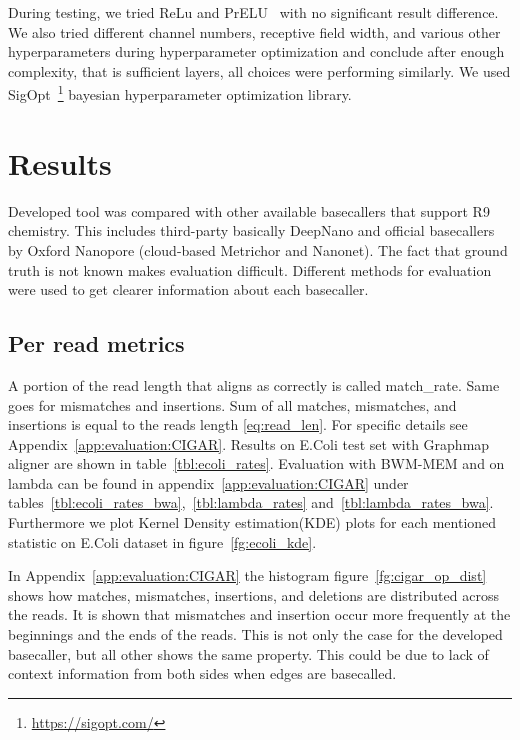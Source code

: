 \documentclass[runningheads,a4paper]{llncs}
\begin{document}
During testing, we tried ReLu and PrELU~\cite{prelu} with no significant result difference. We also tried different channel numbers, receptive field width, and various other hyperparameters during hyperparameter optimization and conclude after enough complexity, that is sufficient layers, all choices were performing similarly. We used SigOpt~\cite{dewancker2016strategy}\footnote{\url{https://sigopt.com/}} bayesian hyperparameter optimization library.

\section{Results}

Developed tool was compared with other available basecallers that support R9 chemistry. This includes third-party basically DeepNano and official basecallers by Oxford Nanopore (cloud-based Metrichor and Nanonet).
The fact that ground truth is not known makes evaluation difficult.
Different methods for evaluation were used to get clearer information about each basecaller.

\subsection{Per read metrics}
\label{subs:read_metrics}
A portion of the read length that aligns as correctly is called match\_rate. Same goes for mismatches and insertions.
Sum of all matches, mismatches, and insertions is equal to the reads length \ref{eq:read_len}. For specific details see Appendix~\ref{app:evaluation:CIGAR}. Results on E.Coli test set with Graphmap aligner are shown in table~\ref{tbl:ecoli_rates}. Evaluation with BWM-MEM and on lambda can be found in appendix~\ref{app:evaluation:CIGAR} under tables~\ref{tbl:ecoli_rates_bwa},~\ref{tbl:lambda_rates} and~\ref{tbl:lambda_rates_bwa}. Furthermore we plot Kernel Density estimation(KDE) plots for each mentioned statistic on E.Coli dataset in figure~\ref{fg:ecoli_kde}.

In Appendix~\ref{app:evaluation:CIGAR} the histogram figure~\ref{fg:cigar_op_dist} shows how matches, mismatches, insertions, and deletions are distributed across the reads. It is shown that mismatches and insertion occur more frequently at the beginnings and the ends of the reads. This is not only the case for the developed basecaller, but all other shows the same property. This could be due to lack of context information from both sides when edges are basecalled.
\end{document}
